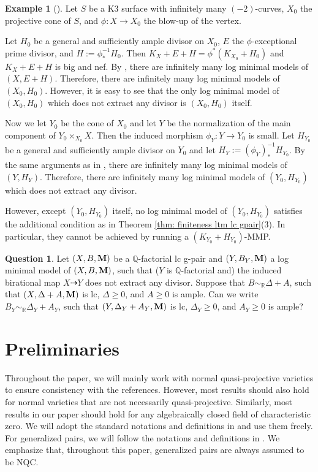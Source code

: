 \documentclass[11pt]{amsart}
\numberwithin{equation}{section}
\newcommand{\Mm}{{\bf{M}}}
\newcommand{\Qq}{\mathbb{Q}}
\theoremstyle{definition}
\newtheorem{ques}[thm]{Question}
\theoremstyle{definition}
\newtheorem{ex}[thm]{Example}
\theoremstyle{definition}
\begin{document}
\begin{ex}[{\cite{Gon09}}]
 Let $S$ be a K3 surface with  infinitely many $(-2)$-curves, $X_0$ the projective cone of $S$, and $\phi: X\rightarrow X_0$ the blow-up of the vertex.
 
 Let $H_0$ be a general and sufficiently ample divisor on $X_0$, $E$ the $\phi$-exceptional prime divisor, and $H:=\phi^{-1}_*H_0$. Then $K_X+E+H=\phi^*(K_{X_0}+H_0)$ and $K_X+E+H$ is big and nef.  By \cite[Example 0.3]{Gon09}, there are infinitely many log minimal models of $(X,E+H)$. Therefore, there are infinitely many log minimal models of $(X_0,H_0)$. However, it is easy to see that the only log minimal model of $(X_0,H_0)$ which does not extract any divisor is $(X_0,H_0)$ itself.
 

Now we let $Y_0$ be the cone of $X_0$ and let $Y$ be the normalization of the main component of $Y_0\times_{X_0}X$. Then the induced morphism $\phi_Y: Y\rightarrow Y_0$ is small. Let $H_{Y_0}$ be a general and sufficiently ample divisor on $Y_0$ and let $H_Y:=(\phi_Y)^{-1}_*H_{Y_0}$. By the same arguments as in \cite[Example 0.3]{Gon09},  there are infinitely many log minimal models of $(Y,H_Y)$. Therefore, there are infinitely many log minimal models of $(Y_0,H_{Y_0})$ which does not extract any divisor. 

However, except $(Y_0,H_{Y_0})$ itself, no log minimal model of $(Y_0,H_{Y_0})$ satisfies the additional condition as in Theorem \ref{thm: finiteness ltm lc gpair}(3). In particular, they cannot be achieved by running a $(K_{Y_0}+H_{Y_0})$-MMP.
\end{ex}

\begin{ques}
    Let $(X,B,\Mm)$ be a $\Qq$-factorial lc g-pair and $(Y,B_Y,\Mm)$ a log minimal model of $(X,B,\Mm)$, such that ($Y$ is $\Qq$-factorial and) the induced birational map $X\dashrightarrow Y$ does not extract any divisor. Suppose that $B\sim_{\mathbb R}\Delta+A$, such that $(X,\Delta+A,\Mm)$ is lc, $\Delta\geq 0$, and $A\geq 0$ is ample. Can we write $B_Y\sim_{\mathbb R}\Delta_Y+A_Y$, such that $(Y,\Delta_Y+A_Y,\Mm)$ is lc, $\Delta_Y\geq 0$, and $A_Y\geq 0$ is ample?
\end{ques}


\section{Preliminaries}

 Throughout the paper, we will mainly work with normal quasi-projective varieties to ensure consistency with the references. However, most results should also hold for normal varieties that are not necessarily quasi-projective. Similarly, most results in our paper should hold for any algebraically closed field of characteristic zero. We will adopt the standard notations and definitions in \cite{KM98, BCHM10} and use them freely. For generalized pairs, we will follow the notations and definitions in \cite{HL21}. We emphasize that, throughout this paper, generalized pairs are always assumed to be NQC.
\end{document}

